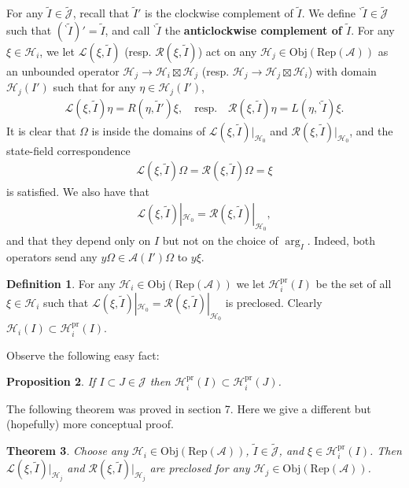\documentclass[12pt,a4paper]{article}
\theoremstyle{definition}
\newtheorem{df}{Definition}[subsection]
\theoremstyle{plain}
\newtheorem{thm}[df]{Theorem}
\newtheorem{pp}[df]{Proposition}
\newcommand{\mc}{\mathcal}
\newcommand{\wtd}{\widetilde}
\newcommand{\scr}{\mathscr}
\newcommand{\Jtd}{\widetilde{\mathcal J}}
\newcommand{\RepA}{\mathrm{Rep}(\mc A)}
\newcommand{\Obj}{\mathrm{Obj}}
\newcommand{\bpr}{{}^\backprime}
\newcommand{\pr}{\mathrm{pr}}
\numberwithin{equation}{subsection}
\begin{document}
For any $\wtd I\in\Jtd$, recall that $\wtd I'$ is the clockwise complement of $\wtd I$. We define ${\bpr\wtd I}\in\Jtd$ such that $(\bpr\wtd I)'=\wtd I$, and call ${\bpr\wtd I}$ the \textbf{anticlockwise complement of $\wtd I$}.  For any $\xi\in\mc H_i$, we let $\scr L(\xi,\wtd I)$ (resp. $\scr R(\xi,\wtd I)$) act on any $\mc H_j\in\Obj(\RepA)$ as an unbounded operator $\mc H_j\rightarrow\mc H_i\boxtimes\mc H_j$ (resp. $\mc H_j\rightarrow\mc H_j\boxtimes\mc H_i$) with domain $\mc H_j(I')$ such that for any $\eta\in\mc H_j(I')$,
\begin{align}
\scr L(\xi,\wtd I)\eta=R(\eta,\wtd I')\xi,\quad \text{resp.}  \quad \scr R(\xi,\wtd I)\eta=L(\eta,\bpr\wtd I)\xi.\label{eq7}
\end{align}
It is clear that $\Omega$ is inside the domains of $\scr L(\xi,\wtd I)|_{\mc H_0}$ and $\scr R(\xi,\wtd I)|_{\mc H_0}$, and the state-field correspondence
\begin{align}
\scr L(\xi,\wtd I)\Omega=\scr R(\xi,\wtd I)\Omega=\xi
\end{align}
is satisfied. We also have that
\begin{align}
\scr L(\xi,\wtd I)|_{\mc H_0}=\scr R(\xi,\wtd I)|_{\mc H_0},
\end{align}
and that they depend only on $I$ but not on the choice of $\arg_I$. Indeed, both operators send any $y\Omega\in\mc A(I')\Omega$ to $y\xi$.

\begin{df}
For any $\mc H_i\in\Obj(\RepA)$ we let $\mc H_i^\pr(I)$ \index{Hi@$\mc H_i^\pr(I)$} be the set of all $\xi\in\mc H_i$ such that $\scr L(\xi,\wtd I)|_{\mc H_0}=\scr R(\xi,\wtd I)|_{\mc H_0}$ is preclosed. Clearly $\mc H_i(I)\subset\mc H_i^\pr(I)$.
\end{df}
 

Observe the following easy fact:

\begin{pp}
	If $I\subset J\in\mc J$ then $\mc H_i^\pr(I)\subset\mc H_i^\pr(J)$.
\end{pp}

The following theorem was proved in \cite{Gui21b} section 7. Here we give a different but (hopefully) more conceptual proof.

\begin{thm}\label{lb12}
Choose any $\mc H_i\in\Obj(\RepA)$, $\wtd I\in\Jtd$, and $\xi\in\mc H_i^\pr(I)$. Then $\scr L(\xi,\wtd I)|_{\mc H_j}$ and $\scr R(\xi,\wtd I)|_{\mc H_j}$ are preclosed for any $\mc H_j\in\Obj(\RepA)$.
\end{thm}
\end{document}

